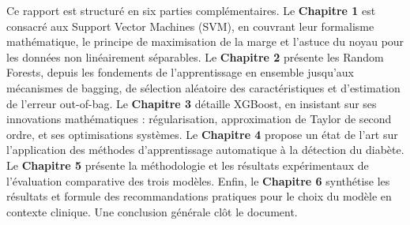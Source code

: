 Ce rapport est structuré en six parties complémentaires. Le \textbf{Chapitre 1} est
consacré aux Support Vector Machines (SVM), en couvrant leur formalisme mathématique,
le principe de maximisation de la marge et l'astuce du noyau pour les données non
linéairement séparables. Le \textbf{Chapitre 2} présente les Random Forests, depuis les
fondements de l'apprentissage en ensemble jusqu'aux mécanismes de bagging, de sélection
aléatoire des caractéristiques et d'estimation de l'erreur out-of-bag. Le \textbf{Chapitre 3}
détaille XGBoost, en insistant sur ses innovations mathématiques : régularisation,
approximation de Taylor de second ordre, et ses optimisations systèmes. Le
\textbf{Chapitre 4} propose un état de l'art sur l'application des méthodes d'apprentissage
automatique à la détection du diabète. Le \textbf{Chapitre 5} présente la méthodologie et les
résultats expérimentaux de l'évaluation comparative des trois modèles. Enfin, le
\textbf{Chapitre 6} synthétise les résultats et formule des recommandations pratiques pour
le choix du modèle en contexte clinique. Une conclusion générale clôt le document.